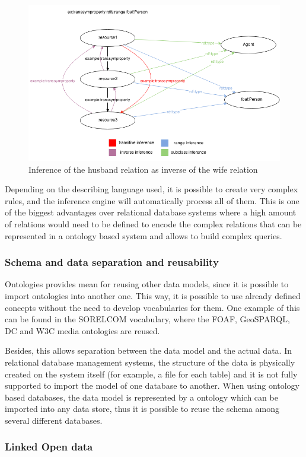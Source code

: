 \begin{figure}[ht]
  \centering
  \includegraphics[width=.6\textwidth]{fig/complex-inference}
  \caption{Inference of the husband relation as inverse of the wife relation}
  \label{fig:complex-inference}
\end{figure}

Depending on the describing language used, it is possible to create very complex rules, and the inference engine will automatically process all of them. This is one of the biggest advantages over relational database systems where a high amount of relations would need to be defined to encode the complex relations that can be represented in a ontology based system and allows to build complex queries.

\subsubsection{Schema and data separation and reusability}

Ontologies provides mean for reusing other data models, since it is possible to import ontologies into another one. This way, it is possible to use already defined concepts without the need to develop vocabularies for them. One example of this can be found in the SORELCOM vocabulary, where the FOAF, GeoSPARQL, DC and W3C media ontologies are reused.

Besides, this allows separation between the data model and the actual data. In relational database management systems, the structure of the data is physically created on the system itself (for example, a file for each table) and it is not fully supported to import the model of one database to another. When using ontology based databases, the data model is represented by a ontology which can be imported into any data store, thus it is possible to reuse the schema among several different databases.

\subsubsection{Linked Open data}

